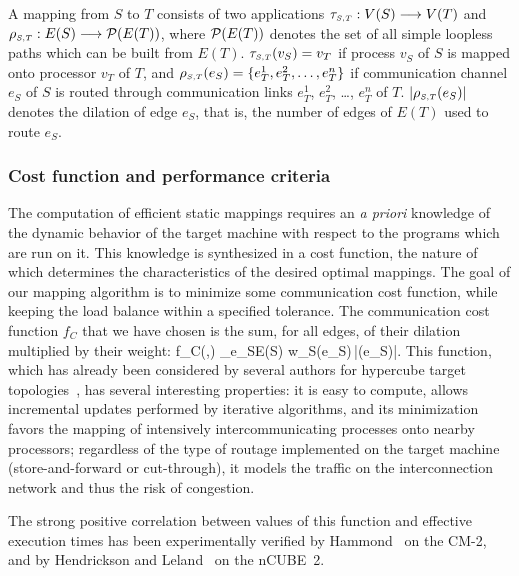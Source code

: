 A mapping from $S$ to $T$ consists of two applications
${\tau_{\scriptscriptstyle {S,T}}} : V(S) \longrightarrow V(T)$ and
${\rho_{\scriptscriptstyle {S,T}}} : E(S) \longrightarrow {\cal P}(E(T))$,
where ${\cal P}(E(T))$ denotes the set of all simple loopless paths which
can be built from $E(T)$.
${\tau_{\scriptscriptstyle {S,T}}}(v_S) = v_T$ if process $v_S$ of $S$ is mapped onto processor
$v_T$ of $T$, and ${\rho_{\scriptscriptstyle {S,T}}}(e_S) = \{ e^1_T, e^2_T, \ldots, e^n_T \}$ if
communication channel $e_S$ of $S$ is routed through communication links
$e^1_T$, $e^2_T$, \ldots, $e^n_T$ of $T$.
$|{\rho_{\scriptscriptstyle {S,T}}}(e_S)|$ denotes the dilation of edge $e_S$, that is, the number of
edges of $E(T)$ used to route $e_S$.

\subsubsection{Cost function and performance criteria}
\label{sec-algo-cost}

The computation of efficient static mappings requires an {\it a priori\/}
knowledge of the dynamic behavior of the target machine with respect to
the programs which are run on it.
This knowledge is synthesized in a cost function, the nature of which
determines the characteristics of the desired optimal mappings.
The goal of our mapping algorithm is to minimize some communication cost
function, while keeping the load balance within a specified tolerance.
The communication cost function $f_C$ that we have chosen is the sum,
for all edges, of their dilation multiplied by their weight:
\bn
f_C(,)
\eqdef \hspace*{-0.25cm}\sum\limits_{e_S\in E(S)}\hspace*{-0.25cm}
w_S(e_S)\,|(e_S)|\enspace.
\en
This function, which has already been considered by several authors for
hypercube target topologies~\cite{errasa90,hamm92,hele94b}, has several
interesting properties:
it is easy to compute, allows incremental updates performed by
iterative algorithms, and
its minimization favors the mapping of intensively intercommunicating
processes onto nearby processors;
regardless of the type of routage implemented on the target machine
(store-and-forward or cut-through), it models the traffic on the
interconnection network and thus the risk of congestion.

The strong positive correlation between values of this function and
effective execution times has been experimentally verified by
Hammond~\cite{hamm92} on the CM-2, and by Hendrickson and
Leland~\cite{hele94a} on the nCUBE~2.
\\

